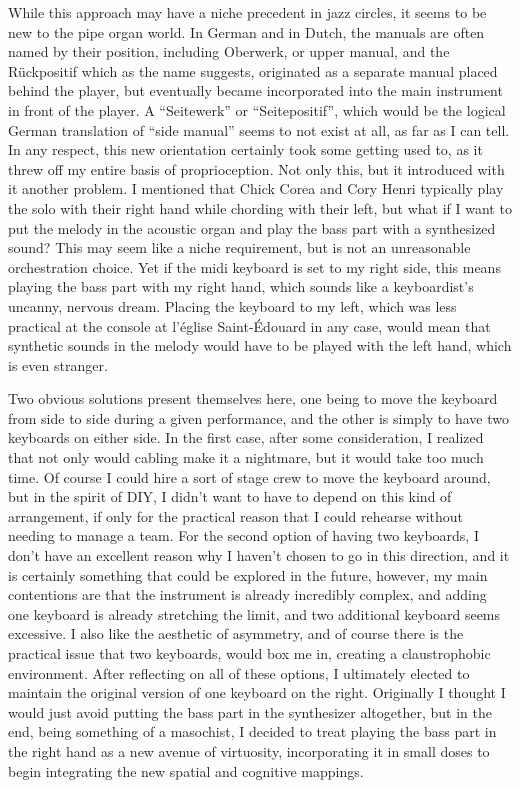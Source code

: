 \documentclass[12pt,twoside,maitrise]{dms_ks}
\theoremstyle{definition}
\begin{document}
While this approach may have a niche precedent in jazz circles, it seems to be new to the pipe organ world. In German and in Dutch, the manuals are often named by their position, including Oberwerk, or upper manual, and the Rückpositif which as the name suggests, originated as a separate manual placed behind the player, but eventually became incorporated into the main instrument in front of the player. A “Seitewerk” or “Seitepositif”, which would be the logical German translation of “side manual” seems to not exist at all, as far as I can tell. In any respect, this new orientation certainly took some getting used to, as it threw off my entire basis of proprioception. Not only this, but it introduced with it another problem. I mentioned that Chick Corea and Cory Henri typically play the solo with their right hand while chording with their left, but what if I want to put the melody in the acoustic organ and play the bass part with a synthesized sound? This may seem like a niche requirement, but is not an unreasonable orchestration choice. Yet if the midi keyboard is set to my right side, this means playing the bass part with my right hand, which sounds like a keyboardist’s uncanny, nervous dream. Placing the keyboard to my left, which was less practical at the console at l’église Saint-Édouard in any case, would mean that synthetic sounds in the melody would have to be played with the left hand, which is even stranger. 

Two obvious solutions present themselves here, one being to move the keyboard from side to side during a given performance, and the other is simply to have two keyboards on either side. In the first case, after some consideration, I realized that not only would cabling make it a nightmare, but it would take too much time. Of course I could hire a sort of stage crew to move the keyboard around, but in the spirit of DIY, I didn’t want to have to depend on this kind of arrangement, if only for the practical reason that I could rehearse without needing to manage a team. For the second option of having two keyboards, I don’t have an excellent reason why I haven’t chosen to go in this direction, and it is certainly something that could be explored in the future, however, my main contentions are that the instrument is already incredibly complex, and adding one keyboard is already stretching the limit, and two additional keyboard seems excessive. I also like the aesthetic of asymmetry, and of course there is the practical issue that two keyboards, would box me in, creating a claustrophobic environment. After reflecting on all of these options, I ultimately elected to maintain the original version of one keyboard on the right. Originally I thought I would just avoid putting the bass part in the synthesizer altogether, but in the end, being something of a masochist, I decided to treat playing the bass part in the right hand as a new avenue of virtuosity, incorporating it in small doses to begin integrating the new spatial and cognitive mappings.
\end{document}
